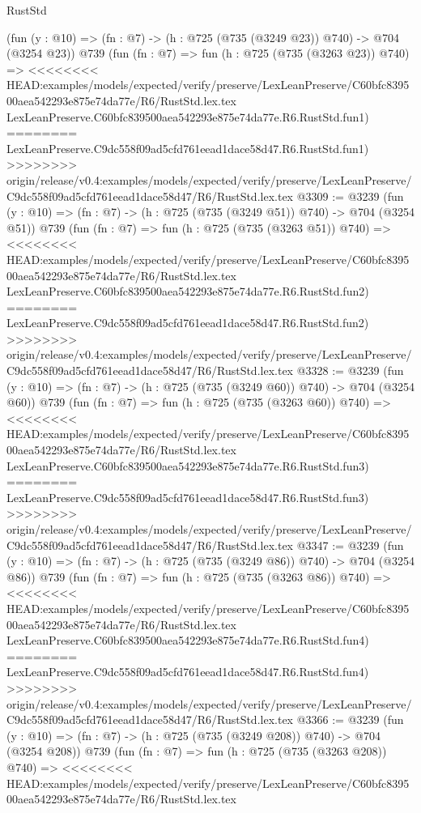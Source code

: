 \begin{lexlean}{RustStd}
\begin{coremodule}
{\begin{coremodule}
{{{{{{{{{{    (fun (y : @10) => (fn : @7) -> (h : @725 (@735 (@3249 @23)) @740) -> @704 (@3254 @23))
    @739
    (fun (fn : @7) =>
    fun (h : @725 (@735 (@3263 @23)) @740) =>
<<<<<<<< HEAD:examples/models/expected/verify/preserve/LexLeanPreserve/C60bfc839500aea542293e875e74da77e/R6/RustStd.lex.tex
    LexLeanPreserve.C60bfc839500aea542293e875e74da77e.R6.RustStd.fun1)
========
    LexLeanPreserve.C9dc558f09ad5cfd761eead1dace58d47.R6.RustStd.fun1)
>>>>>>>> origin/release/v0.4:examples/models/expected/verify/preserve/LexLeanPreserve/C9dc558f09ad5cfd761eead1dace58d47/R6/RustStd.lex.tex
@3309 := @3239
    (fun (y : @10) => (fn : @7) -> (h : @725 (@735 (@3249 @51)) @740) -> @704 (@3254 @51))
    @739
    (fun (fn : @7) =>
    fun (h : @725 (@735 (@3263 @51)) @740) =>
<<<<<<<< HEAD:examples/models/expected/verify/preserve/LexLeanPreserve/C60bfc839500aea542293e875e74da77e/R6/RustStd.lex.tex
    LexLeanPreserve.C60bfc839500aea542293e875e74da77e.R6.RustStd.fun2)
========
    LexLeanPreserve.C9dc558f09ad5cfd761eead1dace58d47.R6.RustStd.fun2)
>>>>>>>> origin/release/v0.4:examples/models/expected/verify/preserve/LexLeanPreserve/C9dc558f09ad5cfd761eead1dace58d47/R6/RustStd.lex.tex
@3328 := @3239
    (fun (y : @10) => (fn : @7) -> (h : @725 (@735 (@3249 @60)) @740) -> @704 (@3254 @60))
    @739
    (fun (fn : @7) =>
    fun (h : @725 (@735 (@3263 @60)) @740) =>
<<<<<<<< HEAD:examples/models/expected/verify/preserve/LexLeanPreserve/C60bfc839500aea542293e875e74da77e/R6/RustStd.lex.tex
    LexLeanPreserve.C60bfc839500aea542293e875e74da77e.R6.RustStd.fun3)
========
    LexLeanPreserve.C9dc558f09ad5cfd761eead1dace58d47.R6.RustStd.fun3)
>>>>>>>> origin/release/v0.4:examples/models/expected/verify/preserve/LexLeanPreserve/C9dc558f09ad5cfd761eead1dace58d47/R6/RustStd.lex.tex
@3347 := @3239
    (fun (y : @10) => (fn : @7) -> (h : @725 (@735 (@3249 @86)) @740) -> @704 (@3254 @86))
    @739
    (fun (fn : @7) =>
    fun (h : @725 (@735 (@3263 @86)) @740) =>
<<<<<<<< HEAD:examples/models/expected/verify/preserve/LexLeanPreserve/C60bfc839500aea542293e875e74da77e/R6/RustStd.lex.tex
    LexLeanPreserve.C60bfc839500aea542293e875e74da77e.R6.RustStd.fun4)
========
    LexLeanPreserve.C9dc558f09ad5cfd761eead1dace58d47.R6.RustStd.fun4)
>>>>>>>> origin/release/v0.4:examples/models/expected/verify/preserve/LexLeanPreserve/C9dc558f09ad5cfd761eead1dace58d47/R6/RustStd.lex.tex
@3366 := @3239
    (fun (y : @10) => (fn : @7) -> (h : @725 (@735 (@3249 @208)) @740) -> @704 (@3254 @208))
    @739
    (fun (fn : @7) =>
    fun (h : @725 (@735 (@3263 @208)) @740) =>
<<<<<<<< HEAD:examples/models/expected/verify/preserve/LexLeanPreserve/C60bfc839500aea542293e875e74da77e/R6/RustStd.lex.tex
}}}}}}}}}}
\end{coremodule}}
\end{coremodule}
\end{lexlean}
